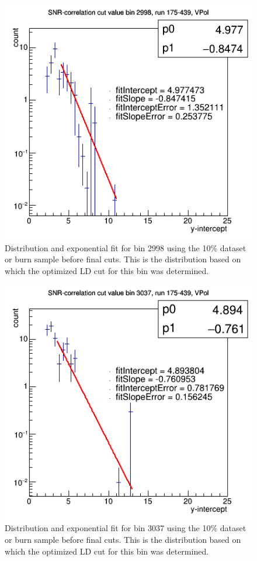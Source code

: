 \begin{figure}
\centering
\includegraphics[width=1.0\textwidth]{figures/cutValHistV02998.png}
\caption{Distribution and exponential fit for bin 2998 using the 10\% dataset or burn sample before final cuts. This is the distribution based on which the optimized LD cut for this bin was determined.}
\label{2998_10pc}
\end{figure}


\begin{figure}
\centering
\includegraphics[width=1.0\textwidth]{figures/cutValHistV03037.png}
\caption{Distribution and exponential fit for bin 3037 using the 10\% dataset or burn sample before final cuts. This is the distribution based on which the optimized LD cut for this bin was determined.}
\label{3037_10pc}
\end{figure}


